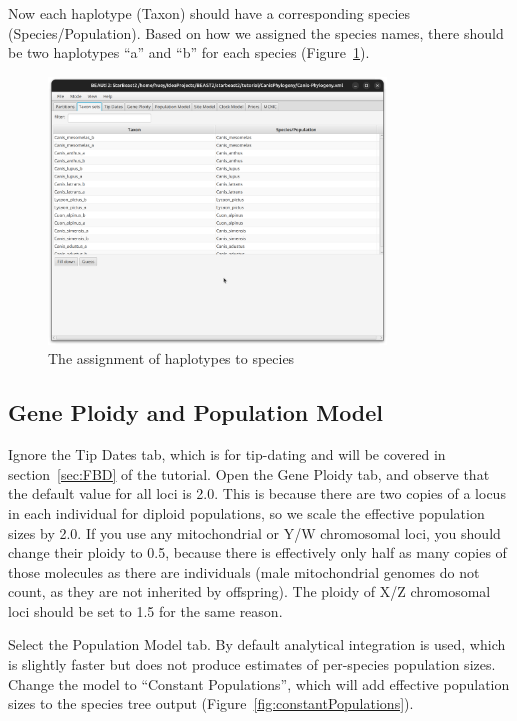 \documentclass[12pt]{article}
\begin{document}
Now each haplotype (Taxon) should have a corresponding species (Species/Population).
Based on how we assigned the species names, there should be two haplotypes
``a'' and ``b'' for each species (Figure~\ref{fig:taxonMap}).

\begin{figure}[htb!]
\centering
\includegraphics[width=0.8\textwidth]{figures/taxonMap.png}
\caption
{The assignment of haplotypes to species}
\label{fig:taxonMap}
\end{figure}

\subsection{Gene Ploidy and Population Model}
\label{subsec:ploidyAndPopModel}

Ignore the Tip Dates tab, which is for tip-dating and will be covered in
section~\ref{sec:FBD} of the tutorial. Open the Gene Ploidy tab, and observe that the default value
for all loci is 2.0. This is because there are two copies of a locus in each
individual for diploid populations, so we scale the effective population sizes
by 2.0. If you use any mitochondrial or Y/W chromosomal loci, you should
change their ploidy to 0.5, because there is effectively only half as many copies of those molecules as there are individuals (male mitochondrial genomes do not count, as they are not inherited by offspring). The ploidy of X/Z chromosomal loci should be set to 1.5 for the
same reason.

Select the Population Model tab. By default analytical integration is used,
which is slightly faster but does not produce estimates of per-species population sizes.
Change the model to ``Constant Populations'', which will add effective population
sizes to the species tree output (Figure~\ref{fig:constantPopulations}).
\end{document}
